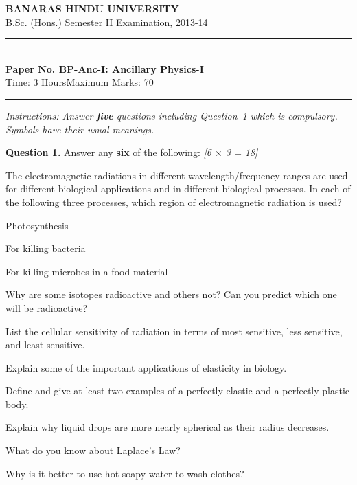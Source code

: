 \documentclass[11pt,a4paper]{article}
\newcommand{\pts}[1]{\hfill   \textit{[#1]}}
\begin{document}
\begin{center}
  {\large\bfseries BANARAS HINDU UNIVERSITY}\\[2pt]
  {\normalsize B.Sc. (Hons.) Semester II Examination, 2013-14}\\[6pt]
  \rule{0.8\linewidth}{0.5pt}\\[6pt]
  {\large\bfseries Paper No. BP-Anc-I: Ancillary Physics-I}\\[4pt]
  {\normalsize Time: 3 Hours\hfill Maximum Marks: 70}
\end{center}
\rule{\linewidth}{0.4pt}
\smallskip



\noindent   \textit{Instructions: Answer   \textbf{five} questions including Question~1 which is compulsory. Symbols have their usual meanings.}
\bigskip




\noindent   \textbf{Question 1.} Answer any   \textbf{six} of the following: \pts{6 $ \times$ 3 = 18}

\begin{parts}
  \item The electromagnetic radiations in different wavelength/frequency ranges are used for different biological applications and in different biological processes. In each of the following three processes, which region of electromagnetic radiation is used?
    
\begin{parts}
      \item Photosynthesis
      \item For killing bacteria
      \item For killing microbes in a food material
    \end{parts}
  \item Why are some isotopes radioactive and others not? Can you predict which one will be radioactive?
  \item List the cellular sensitivity of radiation in terms of most sensitive, less sensitive, and least sensitive.
  \item Explain some of the important applications of elasticity in biology.
  \item Define and give at least two examples of a perfectly elastic and a perfectly plastic body.
  \item Explain why liquid drops are more nearly spherical as their radius decreases.
  \item What do you know about Laplace's Law?
  \item Why is it better to use hot soapy water to wash clothes?
\end{parts}
\end{document}

